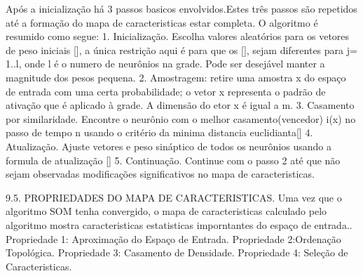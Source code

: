 	Após a inicialização há 3 passos basicos envolvidos.Estes três passos são repetidos até a formação do mapa de caracteristicas estar completa. O algoritmo é resumido como segue: 
1. Inicialização. Escolha valores aleatórios  para os vetores de peso iniciais [], a única restrição aqui é para que os [], sejam diferentes para j= 1..l, onde l é o numero de neurônios na grade. Pode ser desejável manter a magnitude dos pesos pequena.
2. Amostragem: retire uma amostra x do espaço de entrada com uma certa probabilidade; o vetor x representa o padrão de ativação que é aplicado à grade. A dimensão do etor x é igual a m.
3. Casamento por similaridade. Encontre o neurônio com o melhor casamento(vencedor) i(x) no passo de tempo n usando o critério da minima distancia euclidianta[]
4. Atualização. Ajuste vetores e peso sináptico de todos os neurônios usando a formula de atualização []
5. Continuação. Continue com o passo 2 até que não sejam observadas modificações significativos no mapa de caracteristicas.

9.5. PROPRIEDADES DO MAPA DE CARACTERISTICAS.
	Uma vez que o algoritmo SOM tenha convergido, o mapa de caracteristicas calculado pelo algoritmo mostra caracteristicas estatisticas imporntantes do espaço de entrada..
Propriedade 1: Aproximação do Espaço de Entrada.
Propriedade 2:Ordenação Topológica.
Propriedade 3: Casamento de Densidade.
Propriedade 4: Seleção de Caracteristicas.




